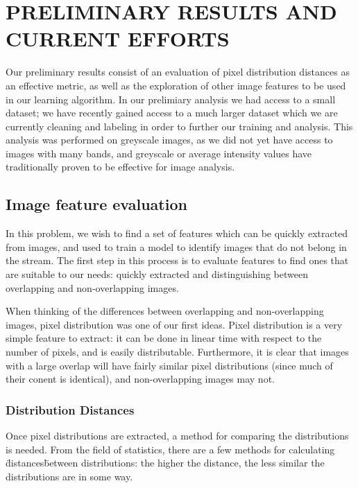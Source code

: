 %
%
%



\chapter{PRELIMINARY RESULTS AND CURRENT EFFORTS}
Our preliminary results consist of an evaluation of pixel distribution distances as an effective metric, as well as the exploration of other image features to be used in our learning algorithm.
In our prelimiary analysis we had access to a small dataset; we have recently gained access to a much larger dataset which we are currently cleaning and labeling in order to further our training and analysis.
This analysis was performed on greyscale images, as we did not yet have access to images with many bands, and greyscale or average intensity values have traditionally proven to be effective for image analysis.

\section{Image feature evaluation}
In this problem, we wish to find a set of features which can be quickly extracted from images, and used to train a model to identify images that do not belong in the stream.
The first step in this process is to evaluate features to find ones that are suitable to our needs: quickly extracted and distinguishing between overlapping and non-overlapping images.

When thinking of the differences between overlapping and non-overlapping images, pixel distribution was one of our first ideas.
Pixel distribution is a very simple feature to extract: it can be done in linear time with respect to the number of pixels, and is easily distributable.
Furthermore, it is clear that images with a large overlap will have fairly similar pixel distributions (since much of their conent is identical), and non-overlapping images may not.


\subsection{Distribution Distances}
Once pixel distributions are extracted, a method for comparing the distributions is needed.
From the field of statistics, there are a few methods for calculating \"distances\" between distributions: the higher the distance, the less similar the distributions are in some way.

